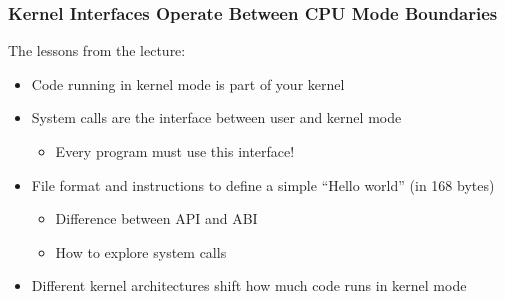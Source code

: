   \begin{frame}
    \frametitle{Kernel Interfaces Operate Between CPU Mode Boundaries}

    The lessons from the lecture:
    \begin{itemize}
      \item Code running in kernel mode is part of your kernel
      \item System calls are the interface between user and kernel mode
        \begin{itemize}
          \item Every program must use this interface!
        \end{itemize}
      \item File format and instructions to define a simple ``Hello world'' (in 168 bytes)
        \begin{itemize}
          \item Difference between API and ABI
          \item How to explore system calls
        \end{itemize}
      \item Different kernel architectures shift how much code runs in kernel mode
    \end{itemize}
  \end{frame}


